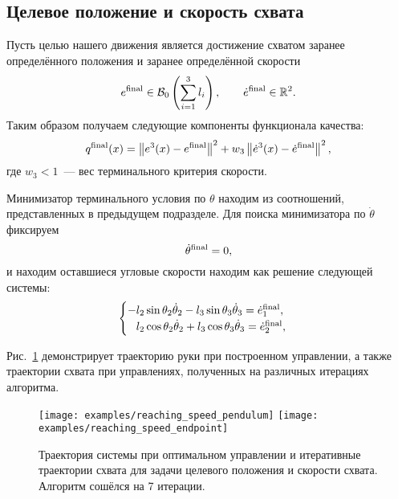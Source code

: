 \documentclass[../../doc.tex]{subfiles}
\begin{document}
    \subsection{Целевое положение и скорость схвата}

    Пусть целью нашего движения является достижение схватом заранее оп\-ределённого положения и заранее определённой скорости
    \begin{equation*}
        e^{\textnormal{final}} \in \mathcal{B}_{0}\left(\sum_{i=1}^{3}l_i\right),
        \qquad
        \dot e^{\textnormal{final}} \in \mathbb{R}^{2}.
    \end{equation*}
    Таким образом получаем следующие компоненты функционала качества:
    \begin{equation}
        q^{\textnormal{final}}(x)
        =
        \left\| e^3(x) -  e^{\textnormal{final}}\right\|^2
        +
        w_3 \left\| \dot e^3(x) -  \dot e^{\textnormal{final}}\right\|^2,
    \end{equation}
    где $w_3 < 1$~--- вес терминального критерия скорости.

    Минимизатор терминального условия по $\theta$ находим из соотношений, представленных в предыдущем подразделе.
    Для поиска минимизатора по $\dot \theta$ фиксируем
    \begin{equation*}
        \dot \theta^{\textnormal{final}} = 0,
    \end{equation*}
    и находим оставшиеся угловые скорости находим как решение следующей системы:
    \begin{equation*}
        \begin{cases}
            - l_2 \sin \theta_2 \dot \theta_2 - l_3 \sin \theta_3 \dot \theta_3 = \dot e_1^{\textnormal{final}},
            \\
            \hphantom{-} l_2 \cos \theta_2 \dot \theta_2 + l_3 \cos \theta_3 \dot \theta_3 = \dot e_2^{\textnormal{final}},
        \end{cases}
    \end{equation*}

    Рис.~\ref{fig:reaching-speed-task} демонстрирует траекторию руки при построенном управлении, а также траектории схвата при управлениях, полученных на различных итерациях алгоритма.
    
    \begin{figure}[h]
        \begin{center}
            \texttt{[image: examples/reaching\_speed\_pendulum]}
            \texttt{[image: examples/reaching\_speed\_endpoint]}
        \end{center}
        \caption{Траектория системы при оптимальном управлении и итеративные траектории схвата для задачи целевого положения и скорости схвата. Алгоритм сошёлся на 7 итерации.}
        \label{fig:reaching-speed-task}
    \end{figure}

    \ifSubfilesClassLoaded{
        \nocite{*}
        \clearpage
        
        
    }{}
\end{document}
